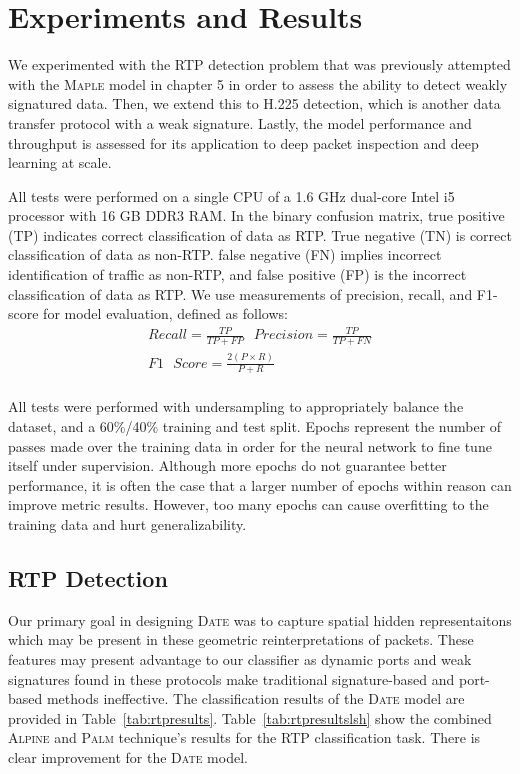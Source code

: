 \section{Experiments and Results}

We experimented with the RTP detection problem that was previously attempted with the \textsc{Maple} model in chapter 5 in order to assess the ability to detect weakly signatured data. Then, we extend this to H.225 detection, which is another data transfer protocol with a weak signature. Lastly, the model performance and throughput is assessed for its application to deep packet inspection and deep learning at scale.

All tests were performed on a single CPU of a 1.6 GHz dual-core Intel i5 processor with 16 GB DDR3 RAM. In the binary confusion matrix, true positive (TP) indicates correct classification of data as RTP. True negative (TN) is correct classification of data as non-RTP. false negative (FN) implies incorrect identification of traffic as non-RTP, and false positive (FP) is the incorrect classification of data as RTP. We use measurements of precision, recall, and F1-score for model evaluation, defined as follows:
\begin{equation}
\begin{split}
    Recall = \frac{TP}{TP + FP} \text{  }
    Precision = \frac{TP}{TP + FN} \\
    F1\text{ }Score = \frac{2(P\times R)}{P + R} \\
    \end{split}
\end{equation}

All tests were performed with undersampling to appropriately balance the dataset, and a 60\%/40\% training and test split. Epochs represent the number of passes made over the training data in order for the neural network to fine tune itself under supervision. Although more epochs do not guarantee better performance, it is often the case that a larger number of epochs within reason can improve metric results. However, too many epochs can cause overfitting to the training data and hurt generalizability.

\subsection{RTP Detection}
Our primary goal in designing \textsc{Date} was to capture spatial hidden representaitons which may be present in these geometric reinterpretations of packets. These features may present advantage to our classifier as dynamic ports and weak signatures found in these protocols make traditional signature-based and port-based methods ineffective. The classification results of the \textsc{Date} model are provided in Table~\ref{tab:rtpresults}. Table~\ref{tab:rtpresultslsh} show the combined \textsc{Alpine} and \textsc{Palm} technique's results for the RTP classification task. There is clear improvement for the \textsc{Date} model.

